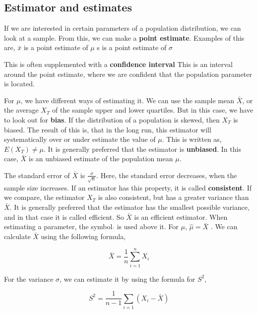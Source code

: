\subsection{Estimator and estimates}
If we are interested in certain parameters of a population distribution, we can look at a sample. From this, we can make a \textbf{point estimate}. 
\newline
Examples of this are, 
\newline
$\bar{x}$ is a point estimate of $\mu$
\newline
s is a point estimate of $\sigma$
\newline

\noindent This is often supplemented with a \textbf{confidence interval}
\newline
This is an interval around the point estimate, where we are confident that the population parameter is located.
\newline

\noindent For $\mu$, we have different ways of estimating it. We can use the sample mean $\bar{X}$, or the average $X_T$ of the sample upper and lower quartiles. 
But in this case, we have to look out for \textbf{bias}. If the distribution of a population is skewed, then $X_T$ is biased. The result of this is, that in the long run, this estimator will systematically over or under estimate the value of $\mu$. This is written as,
\newline
$E(X_T) \neq \mu$.
\newline
It is generally preferred that the estimator is \textbf{unbiased}. In this case, $\bar{X}$ is an unbiased estimate of the population mean $\mu$.
\newline

\noindent The standard error of $\bar{X}$ is $\frac{\sigma}{\sqrt{n}}$. Here, the standard error decreases, when the sample size increases. If an estimator has this property, it is called \textbf{consistent}. If we compare, the estimator $X_T$ is also consistent, but has a greater variance than $\bar{X}$. 
\newline
It is generally preferred that the estimator has the smallest possible variance, and in that case it is called efficient. So $\bar{X}$ is an efficient estimator.
\newline
When estimating a parameter, the symbol $\hat{}$ is used above it. For $\mu$, $\hat{\mu} = \bar{X}$ .
\newline
We can calculate $\bar{X}$ using the following formula,

\begin{equation}
	\bar{X}=\frac{1}{n} \sum_{i=1}^{n}X_i
\end{equation}


For the variance $\sigma$, we can estimate it by using the formula for $S^2$,

\begin{equation}
	S^2=\frac{1}{n-1} \sum_{i=1}(X_i-\bar{X})
\end{equation}
